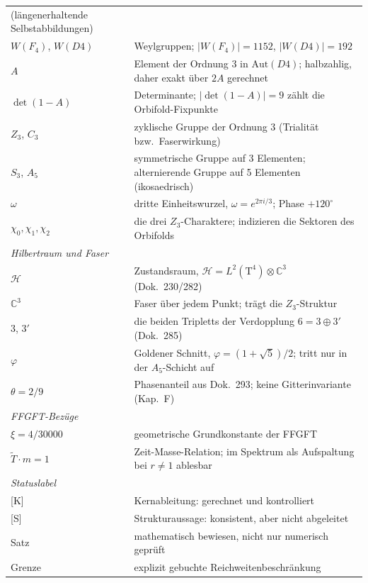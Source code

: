\documentclass[11pt]{report}
\begin{document}
\begin{center}
{\begin{longtable}{lp{9.6cm}}
  (längenerhaltende Selbstabbildungen) \\
$W(F_4)$, $W(D4)$ & Weylgruppen; $|W(F_4)| = 1152$,
  $|W(D4)| = 192$ \\
$A$ & Element der Ordnung 3 in $\text{Aut}(D4)$; halbzahlig, daher
  exakt über $2A$ gerechnet \\
$\det(1-A)$ & Determinante; $|\det(1-A)| = 9$ zählt die
  Orbifold-Fixpunkte \\
$Z_3$, $C_3$ & zyklische Gruppe der Ordnung 3 (Trialität bzw.\
  Faserwirkung) \\
$S_3$, $A_5$ & symmetrische Gruppe auf 3 Elementen; alternierende
  Gruppe auf 5 Elementen (ikosaedrisch) \\
$\omega$ & dritte Einheitswurzel, $\omega = e^{2\pi i/3}$;
  Phase $+120^\circ$ \\
$\chi_0,\chi_1,\chi_2$ & die drei $Z_3$-Charaktere; indizieren die
  Sektoren des Orbifolds \\
\midrule
\multicolumn{2}{l}{\textit{Hilbertraum und Faser}} \\
$\mathcal{H}$ & Zustandsraum,
  $\mathcal{H} = L^2(\text{T}^4)\otimes\mathbb{C}^3$
  (Dok.~230/282) \\
$\mathbb{C}^3$ & Faser über jedem Punkt; trägt die
  $Z_3$-Struktur \\
$3$, $3'$ & die beiden Tripletts der Verdopplung
  $6 = 3\oplus3'$ (Dok.~285) \\
$\varphi$ & Goldener Schnitt, $\varphi = (1+\sqrt5)/2$; tritt nur
  in der $A_5$-Schicht auf \\
$\theta = 2/9$ & Phasenanteil aus Dok.~293; keine Gitterinvariante
  (Kap.~F) \\
\midrule
\multicolumn{2}{l}{\textit{FFGFT-Bezüge}} \\
$\xi = 4/30000$ & geometrische Grundkonstante der FFGFT \\
$\tilde T\cdot m = 1$ & Zeit-Masse-Relation; im Spektrum als
  Aufspaltung bei $r \ne 1$ ablesbar \\
\midrule
\multicolumn{2}{l}{\textit{Statuslabel}} \\
{}[K] & Kernableitung: gerechnet und kontrolliert \\
{}[S] & Strukturaussage: konsistent, aber nicht abgeleitet \\
Satz & mathematisch bewiesen, nicht nur numerisch geprüft \\
Grenze & explizit gebuchte Reichweitenbeschränkung \\
\end{longtable}
}
\end{center}
\end{document}
